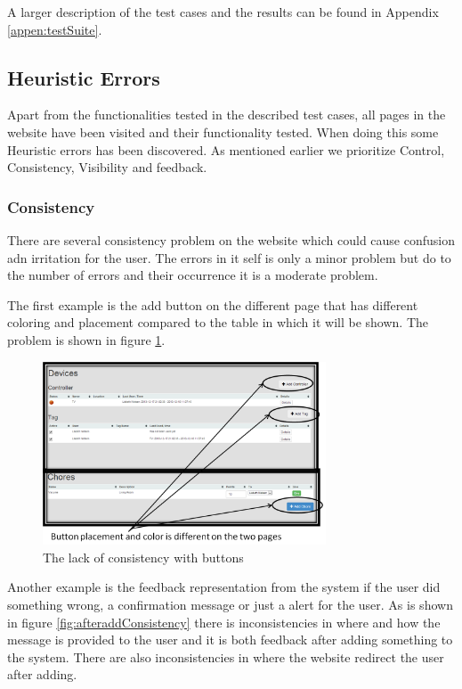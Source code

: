 A larger description of the test cases and the results can be found in Appendix \ref{appen:testSuite}.

\subsection{Heuristic Errors}
 Apart from the functionalities tested in the described test cases, all pages in the website have been visited and their functionality tested. When doing this some Heuristic errors has been discovered. As mentioned earlier we prioritize Control, Consistency, Visibility and feedback.


\subsubsection{Consistency}
There are several consistency problem on the website which could cause confusion adn irritation for the user. The errors in it self is only a minor problem but do to the number of errors and their occurrence it is a moderate problem.   

The first example is the add button on the different page that has different coloring and placement compared to the table in which it will be shown. The problem is shown in figure \ref{fig:consistencyButton}.

\begin{figure}
	\centering
		\includegraphics[width=0.75\textwidth]{images/consistencyButton.png}
	\caption{The lack of consistency with buttons}
	\label{fig:consistencyButton}
\end{figure}


Another example is the feedback representation from the system if the user did something wrong, a confirmation message or just a alert for the user. As is shown in figure \ref{fig:afteraddConsistency} there is inconsistencies in where and how the message is provided to the user and it is both feedback after adding something to the system. There are also inconsistencies in where the website redirect the user after adding.

